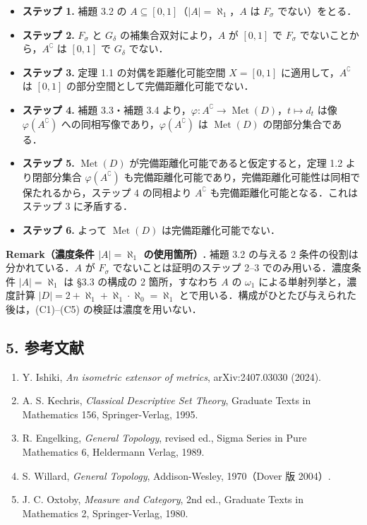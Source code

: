 \documentclass[
  lualatex,ja=standard]{bxjsarticle}
\providecommand{\tightlist}{%
  \setlength{\itemsep}{0pt}\setlength{\parskip}{0pt}}
\begin{document}
\begin{itemize}
\tightlist
\item
  \textbf{ステップ 1.} 補題 3.2 の
  \(A \subseteq [0,1]\)（\(\lvert A\rvert = \aleph_1\)，\(A\) は
  \(F_\sigma\) でない）をとる．
\item
  \textbf{ステップ 2.} \(F_\sigma\) と \(G_\delta\)
  の補集合双対により，\(A\) が \([0,1]\) で \(F_\sigma\)
  でないことから，\(A^\complement\) は \([0,1]\) で \(G_\delta\)
  でない．
\item
  \textbf{ステップ 3.} 定理 1.1 の対偶を距離化可能空間 \(X = [0,1]\)
  に適用して，\(A^\complement\) は \([0,1]\)
  の部分空間として完備距離化可能でない．
\item
  \textbf{ステップ 4.} 補題 3.3・補題 3.4
  より，\(\varphi : A^\complement \to \operatorname{Met}(D)\)，\(t \mapsto d_t\)
  は像 \(\varphi(A^\complement)\)
  への同相写像であり，\(\varphi(A^\complement)\) は
  \(\operatorname{Met}(D)\) の閉部分集合である．
\item
  \textbf{ステップ 5.} \(\operatorname{Met}(D)\)
  が完備距離化可能であると仮定すると，定理 1.2 より閉部分集合
  \(\varphi(A^\complement)\)
  も完備距離化可能であり，完備距離化可能性は同相で保たれるから，ステップ
  4 の同相より \(A^\complement\) も完備距離化可能となる．これはステップ
  3 に矛盾する．
\item
  \textbf{ステップ 6.} よって \(\operatorname{Met}(D)\)
  は完備距離化可能でない．
\end{itemize}

\textbf{Remark（濃度条件 \(\lvert A\rvert = \aleph_1\) の使用箇所）.}
補題 3.2 の与える 2 条件の役割は分かれている．\(A\) が \(F_\sigma\)
でないことは証明のステップ 2--3 でのみ用いる．濃度条件
\(\lvert A\rvert = \aleph_1\) は §3.3 の構成の 2 箇所，すなわち \(A\) の
\(\omega_1\) による単射列挙と，濃度計算
\(\lvert D\rvert = 2 + \aleph_1 + \aleph_1 \cdot \aleph_0 = \aleph_1\)
とで用いる．構成がひとたび与えられた後は，(C1)--(C5)
の検証は濃度を用いない．

\hypertarget{ux53c2ux8003ux6587ux732e}{%
\subsection{5. 参考文献}\label{ux53c2ux8003ux6587ux732e}}

\begin{enumerate}
\def\labelenumi{\arabic{enumi}.}
\tightlist
\item
  Y. Ishiki, \emph{An isometric extensor of metrics}, arXiv:2407.03030
  (2024).
\item
  A. S. Kechris, \emph{Classical Descriptive Set Theory}, Graduate Texts
  in Mathematics 156, Springer-Verlag, 1995.
\item
  R. Engelking, \emph{General Topology}, revised ed., Sigma Series in
  Pure Mathematics 6, Heldermann Verlag, 1989.
\item
  S. Willard, \emph{General Topology}, Addison-Wesley, 1970（Dover 版
  2004）.
\item
  J. C. Oxtoby, \emph{Measure and Category}, 2nd ed., Graduate Texts in
  Mathematics 2, Springer-Verlag, 1980.
\end{enumerate}
\end{document}
